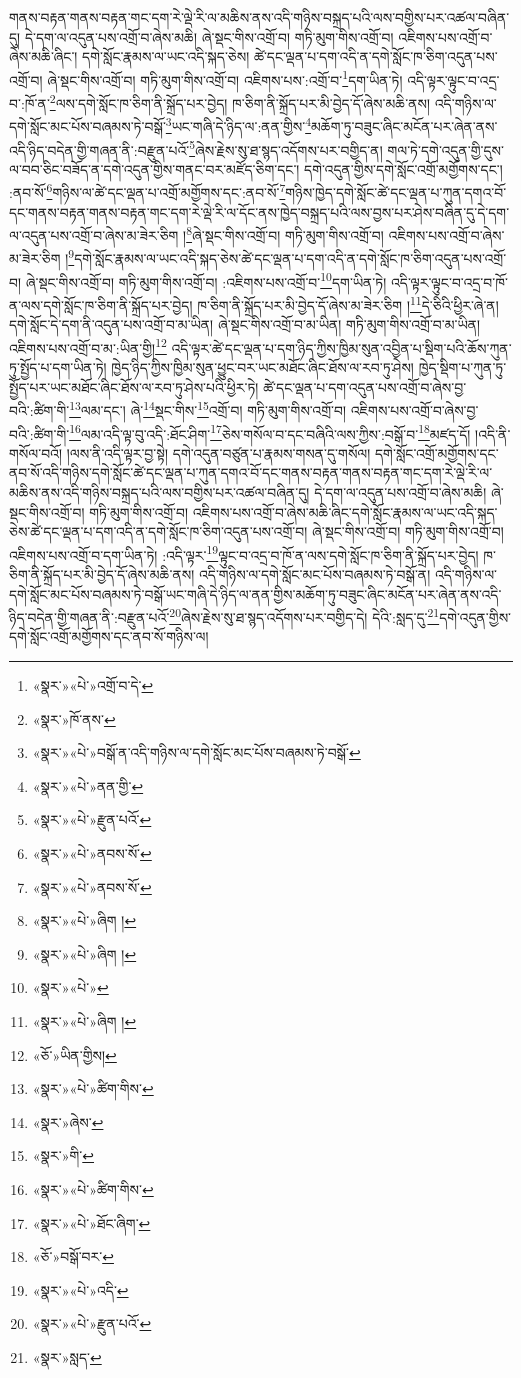 གནས་བརྟན་གནས་བརྟན་གང་དག་རེ་ལྡེ་རི་ལ་མཆིས་ནས་འདི་གཉིས་བསྐྲད་པའི་ལས་བགྱིས་པར་འཚལ་བཞིན་དུ། དེ་དག་ལ་འདུན་པས་འགྲོ་བ་ཞེས་མཆི། ཞེ་སྡང་གིས་འགྲོ་བ། གཏི་མུག་གིས་འགྲོ་བ། འཇིགས་པས་འགྲོ་བ་ཞེས་མཆི་ཞིང་། དགེ་སློང་རྣམས་ལ་ཡང་འདི་སྐད་ཅེས། ཚེ་དང་ལྡན་པ་དག་འདི་ན་དགེ་སློང་ཁ་ཅིག་འདུན་པས་འགྲོ་བ། ཞེ་སྡང་གིས་འགྲོ་བ། གཏི་མུག་གིས་འགྲོ་བ། འཇིགས་པས་:འགྲོ་བ་\footnote{«སྣར་»«པེ་»འགྲོ་བ་དེ་}དག་ཡིན་ཏེ། འདི་ལྟར་ལྟུང་བ་འདྲ་བ་:ཁོ་ན་\footnote{«སྣར་»ཁོ་ནས་}ལས་དགེ་སློང་ཁ་ཅིག་ནི་སྐྲོད་པར་བྱེད། ཁ་ཅིག་ནི་སྐྲོད་པར་མི་བྱེད་དོ་ཞེས་མཆི་ནས། འདི་གཉིས་ལ་དགེ་སློང་མང་པོས་བཞམས་ཏེ་བསྒོ་\footnote{«སྣར་»«པེ་»བསྒོ་ན་འདི་གཉིས་ལ་དགེ་སློང་མང་པོས་བཞམས་ཏེ་བསྒོ་}ཡང་གཞི་དེ་ཉིད་ལ་:ནན་གྱིས་\footnote{«སྣར་»«པེ་»ནན་གྱི་}མཆོག་ཏུ་བཟུང་ཞིང་མངོན་པར་ཞེན་ནས་འདི་ཉིད་བདེན་གྱི་གཞན་ནི་:བརྫུན་པའོ་\footnote{«སྣར་»«པེ་»རྫུན་པའོ་}ཞེས་རྗེས་སུ་ཐ་སྙད་འདོགས་པར་བགྱིད་ན། གལ་ཏེ་དགེ་འདུན་གྱི་དུས་ལ་བབ་ཅིང་བཟོད་ན་དགེ་འདུན་གྱིས་གནང་བར་མཛོད་ཅིག་དང་། དགེ་འདུན་གྱིས་དགེ་སློང་འགྲོ་མགྱོགས་དང་། :ནབ་སོ་\footnote{«སྣར་»«པེ་»ནབས་སོ་}གཉིས་ལ་ཚེ་དང་ལྡན་པ་འགྲོ་མགྱོགས་དང་:ནབ་སོ་\footnote{«སྣར་»«པེ་»ནབས་སོ་}གཉིས་ཁྱེད་དགེ་སློང་ཚེ་དང་ལྡན་པ་ཀུན་དགའ་བོ་དང་གནས་བརྟན་གནས་བརྟན་གང་དག་རེ་ལྡེ་རི་ལ་དོང་ནས་ཁྱེད་བསྐྲད་པའི་ལས་བྱས་པར་ཤེས་བཞིན་དུ་དེ་དག་ལ་འདུན་པས་འགྲོ་བ་ཞེས་མ་ཟེར་ཅིག །\footnote{«སྣར་»«པེ་»ཞིག །}ཞེ་སྡང་གིས་འགྲོ་བ། གཏི་མུག་གིས་འགྲོ་བ། འཇིགས་པས་འགྲོ་བ་ཞེས་མ་ཟེར་ཅིག །\footnote{«སྣར་»«པེ་»ཞིག །}དགེ་སློང་རྣམས་ལ་ཡང་འདི་སྐད་ཅེས་ཚེ་དང་ལྡན་པ་དག་འདི་ན་དགེ་སློང་ཁ་ཅིག་འདུན་པས་འགྲོ་བ། ཞེ་སྡང་གིས་འགྲོ་བ། གཏི་མུག་གིས་འགྲོ་བ། :འཇིགས་པས་འགྲོ་བ་\footnote{«སྣར་»«པེ་»}དག་ཡིན་ཏེ། འདི་ལྟར་ལྟུང་བ་འདྲ་བ་ཁོ་ན་ལས་དགེ་སློང་ཁ་ཅིག་ནི་སྐྲོད་པར་བྱེད། ཁ་ཅིག་ནི་སྐྲོད་པར་མི་བྱེད་དོ་ཞེས་མ་ཟེར་ཅིག །\footnote{«སྣར་»«པེ་»ཞིག །}དེ་ཅིའི་ཕྱིར་ཞེ་ན། དགེ་སློང་དེ་དག་ནི་འདུན་པས་འགྲོ་བ་མ་ཡིན། ཞེ་སྡང་གིས་འགྲོ་བ་མ་ཡིན། གཏི་མུག་གིས་འགྲོ་བ་མ་ཡིན། འཇིགས་པས་འགྲོ་བ་མ་:ཡིན་གྱི།\footnote{«ཅོ་»ཡིན་གྱིས།} འདི་ལྟར་ཚེ་དང་ལྡན་པ་དག་ཉིད་ཀྱིས་ཁྱིམ་སུན་འབྱིན་པ་སྡིག་པའི་ཆོས་ཀུན་ཏུ་སྤྱོད་པ་དག་ཡིན་ཏེ། ཁྱེད་ཉིད་ཀྱིས་ཁྱིམ་སུན་ཕྱུང་བར་ཡང་མཐོང་ཞིང་ཐོས་ལ་རབ་ཏུ་ཤེས། ཁྱེད་སྡིག་པ་ཀུན་ཏུ་སྤྱོད་པར་ཡང་མཐོང་ཞིང་ཐོས་ལ་རབ་ཏུ་ཤེས་པའི་ཕྱིར་ཏེ། ཚེ་དང་ལྡན་པ་དག་འདུན་པས་འགྲོ་བ་ཞེས་བྱ་བའི་:ཚིག་གི་\footnote{«སྣར་»«པེ་»ཚིག་གིས་}ལམ་དང་། ཞེ་\footnote{«སྣར་»ཞེས་}སྡང་གིས་\footnote{«སྣར་»གི་}འགྲོ་བ། གཏི་མུག་གིས་འགྲོ་བ། འཇིགས་པས་འགྲོ་བ་ཞེས་བྱ་བའི་:ཚིག་གི་\footnote{«སྣར་»«པེ་»ཚིག་གིས་}ལམ་འདི་ལྟ་བུ་འདི་:ཐོང་ཤིག་\footnote{«སྣར་»«པེ་»ཐོང་ཞིག་}ཅེས་གསོལ་བ་དང་བཞིའི་ལས་ཀྱིས་:བསྒོ་བ་\footnote{«ཅོ་»བསྒོ་བར་}མཛད་དོ། །འདི་ནི་གསོལ་བའོ། །ལས་ནི་འདི་ལྟར་བྱ་སྟེ། དགེ་འདུན་བཙུན་པ་རྣམས་གསན་དུ་གསོལ། དགེ་སློང་འགྲོ་མགྱོགས་དང་ནབ་སོ་འདི་གཉིས་དགེ་སློང་ཚེ་དང་ལྡན་པ་ཀུན་དགའ་བོ་དང་གནས་བརྟན་གནས་བརྟན་གང་དག་རེ་ལྡེ་རི་ལ་མཆིས་ནས་འདི་གཉིས་བསྐྲད་པའི་ལས་བགྱིས་པར་འཚལ་བཞིན་དུ། དེ་དག་ལ་འདུན་པས་འགྲོ་བ་ཞེས་མཆི། ཞེ་སྡང་གིས་འགྲོ་བ། གཏི་མུག་གིས་འགྲོ་བ། འཇིགས་པས་འགྲོ་བ་ཞེས་མཆི་ཞིང་དགེ་སློང་རྣམས་ལ་ཡང་འདི་སྐད་ཅེས་ཚེ་དང་ལྡན་པ་དག་འདི་ན་དགེ་སློང་ཁ་ཅིག་འདུན་པས་འགྲོ་བ། ཞེ་སྡང་གིས་འགྲོ་བ། གཏི་མུག་གིས་འགྲོ་བ། འཇིགས་པས་འགྲོ་བ་དག་ཡིན་ཏེ། :འདི་ལྟར་\footnote{«སྣར་»«པེ་»འདི་}ལྟུང་བ་འདྲ་བ་ཁོ་ན་ལས་དགེ་སློང་ཁ་ཅིག་ནི་སྐྲོད་པར་བྱེད། ཁ་ཅིག་ནི་སྐྲོད་པར་མི་བྱེད་དོ་ཞེས་མཆི་ནས། འདི་གཉིས་ལ་དགེ་སློང་མང་པོས་བཞམས་ཏེ་བསྒོ་ན། འདི་གཉིས་ལ་དགེ་སློང་མང་པོས་བཞམས་ཏེ་བསྒོ་ཡང་གཞི་དེ་ཉིད་ལ་ནན་གྱིས་མཆོག་ཏུ་བཟུང་ཞིང་མངོན་པར་ཞེན་ནས་འདི་ཉིད་བདེན་གྱི་གཞན་ནི་:བརྫུན་པའོ་\footnote{«སྣར་»«པེ་»རྫུན་པའོ་}ཞེས་རྗེས་སུ་ཐ་སྙད་འདོགས་པར་བགྱིད་དེ། དེའི་:སླད་དུ་\footnote{«སྣར་»སླད་}དགེ་འདུན་གྱིས་དགེ་སློང་འགྲོ་མགྱོགས་དང་ནབ་སོ་གཉིས་ལ། 